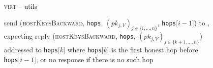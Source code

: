 \begin{figure}[H]
\begin{processbox}{\textsc{virt} -- utils}
\begin{algorithmic}[1]
              \State send (\textsc{hostKeysBackward}, \texttt{hops}, $(pk_{j,
              V})_{j \in \{i, \dots, n\}}$, \texttt{hops}[$i-1$]) to \adversary,
              expecting reply (\textsc{hostKeysBackward}, \texttt{hops}, $(pk_{j,
              V})_{j \in \{k+1, \dots, n\}}$) addressed to \texttt{hops}[$k$]
              where \texttt{hops}[$k$] is the first honest hop before
              \texttt{hops}[$i-1$], or no response if there is no such hop
            \EndIf
          \EndIf
        \EndFor {}
      \EndIndent
    \end{algorithmic}
  \end{processbox}
  \caption{}
  \label{code:virtual-layer:host-keys}
\end{figure}
